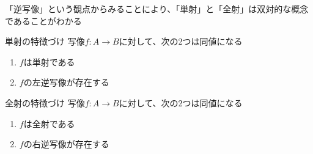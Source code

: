\documentclass[../../../topic_mapping]{subfiles}
\begin{document}
\sectionline

「逆写像」という観点からみることにより、「単射」と「全射」は双対的な概念であることがわかる

\begin{theorem}{単射の特徴づけ}
  写像$f\colon A \to B$に対して、次の2つは同値になる
  \begin{enumerate}
    \item $f$は単射である
    \item $f$の左逆写像が存在する
  \end{enumerate}
\end{theorem}

\begin{theorem}{全射の特徴づけ}
  写像$f\colon A \to B$に対して、次の2つは同値になる
  \begin{enumerate}
    \item $f$は全射である
    \item $f$の右逆写像が存在する
  \end{enumerate}
\end{theorem}
\end{document}
